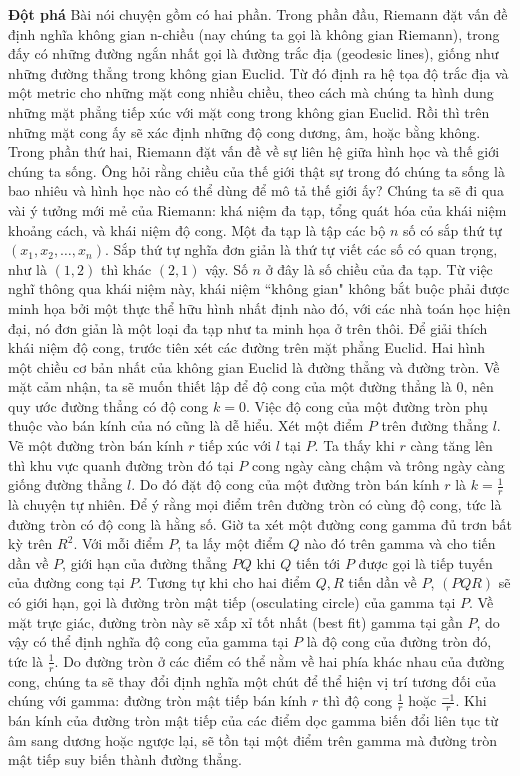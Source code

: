 \begin{multicols}{2}
	\vskip 0.1cm
	\textbf{\color{lichsutoanhoc}Đột phá}
	\vskip 0.1cm
	Bài nói chuyện gồm có hai phần.
	Trong phần đầu, Riemann đặt vấn đề định nghĩa không gian n-chiều (nay chúng ta gọi là không gian Riemann), trong đấy có những đường ngắn nhất gọi là đường trắc địa (geodesic lines), giống như những đường thẳng trong không gian Euclid. Từ đó định ra hệ tọa độ trắc địa và một metric cho những mặt cong nhiều chiều, theo cách mà chúng ta hình dung những mặt phẳng tiếp xúc với mặt cong trong không gian Euclid. Rồi thì trên những mặt cong ấy sẽ xác định những độ cong dương, âm, hoặc bằng không.
	Trong phần thứ hai, Riemann đặt vấn đề về sự liên hệ giữa hình học và thế giới chúng ta sống. Ông hỏi rằng chiều của thế giới thật sự trong đó chúng ta sống là bao nhiêu và hình học nào có thể dùng để mô tả thế giới ấy?
	\vskip 0.1cm
	Chúng ta sẽ đi qua vài ý tưởng mới mẻ của Riemann: khá niệm đa tạp, tổng quát hóa của khái niệm khoảng cách, và khái niệm độ cong. 
	\vskip 0.1cm
	Một đa tạp là tập các bộ $n$ số có sắp thứ tự $(x_1, x_2, \ldots, x_n)$. Sắp thứ tự nghĩa đơn giản là thứ tự viết các số có quan trọng, như là $(1, 2)$ thì khác $(2, 1)$ vậy. Số $n$ ở đây là số chiều của đa tạp. Từ việc nghĩ thông qua khái niệm này, khái niệm ``không gian" không bắt buộc phải được minh họa bởi một thực thể hữu hình nhất định nào đó, với các nhà toán học hiện đại, nó đơn giản là một loại đa tạp như ta minh họa ở trên thôi. 
	\vskip 0.1cm
	Để giải thích khái niệm độ cong, trước tiên xét các đường trên mặt phẳng Euclid. Hai hình một chiều cơ bản nhất của không gian Euclid là đường thẳng và đường tròn. Về mặt cảm nhận, ta sẽ muốn thiết lập để độ cong của một đường thẳng là $0$, nên quy ước đường thẳng có độ cong $k = 0$. Việc độ cong của một đường tròn phụ thuộc vào bán kính của nó cũng là dễ hiểu. Xét một điểm $P$ trên đường thẳng $l$. Vẽ một đường tròn bán kính $r$ tiếp xúc với $l$ tại $P$. Ta thấy khi $r$ càng tăng lên thì khu vực quanh đường tròn đó tại $P$ cong ngày càng chậm và trông ngày càng giống đường thẳng $l$. Do đó đặt độ cong của một đường tròn bán kính $r$ là $k = \frac{1}{r}$ là chuyện tự nhiên. Để ý rằng mọi điểm trên đường tròn có cùng độ cong, tức là đường tròn có độ cong là hằng số.
	\vskip 0.1cm
	Giờ ta xét một đường cong gamma đủ trơn bất kỳ trên $R^2$. Với mỗi điểm $P$, ta lấy một điểm $Q$ nào đó trên gamma và cho tiến dần về $P$, giới hạn của đường thẳng $PQ$ khi $Q$ tiến tới $P$ được gọi là tiếp tuyến của đường cong tại $P$. Tương tự khi cho hai điểm $Q, R$ tiến dần về $P$, $(PQR)$ sẽ có giới hạn, gọi là đường tròn mật tiếp (osculating circle) của gamma tại $P$. Về mặt trực giác, đường tròn này sẽ xấp xỉ tốt nhất (best fit) gamma tại gần $P$, do vậy có thể định nghĩa độ cong của gamma tại $P$ là độ cong của đường tròn đó, tức là $ \frac{1}{r}$. Do đường tròn ở các điểm có thể nằm về hai phía khác nhau của đường cong, chúng ta sẽ thay đổi định nghĩa một chút để thể hiện vị trí tương đối của chúng với gamma: đường tròn mật tiếp bán kính $r$ thì độ cong $ \frac{1}{r}$ hoặc $ \frac{-1}{r}$. Khi bán kính của đường tròn mật tiếp của các điểm dọc gamma biến đổi liên tục từ âm sang dương hoặc ngược lại, sẽ tồn tại một điểm trên gamma mà đường tròn mật tiếp suy biến thành đường thẳng.

\end{multicols}

